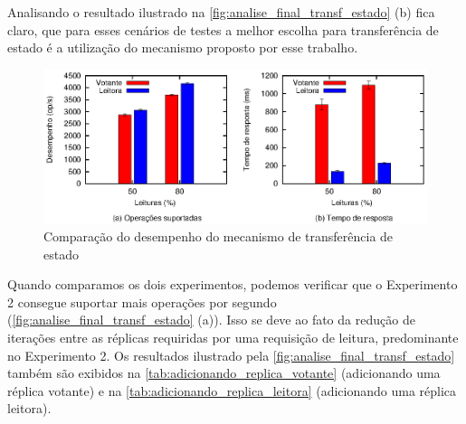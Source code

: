 Analisando o resultado ilustrado na \autoref{fig:analise_final_transf_estado} (b) fica
claro, que para esses cenários de testes a melhor escolha para transferência de estado é a
utilização do mecanismo proposto por esse trabalho.

\begin{figure}[ht]
  \centering
  \includegraphics[width=14cm]{conteudo/capitulos/figuras/final-transf-estado.eps}
  \caption{Comparação do desempenho do mecanismo de transferência de estado}
  \label{fig:analise_final_transf_estado}
\end{figure}

Quando comparamos os dois experimentos, podemos verificar que o Experimento 2 consegue
suportar mais operações por segundo (\autoref{fig:analise_final_transf_estado} (a)). Isso
se deve ao fato da redução de iterações entre as réplicas requiridas por uma requisição de
leitura, predominante no Experimento 2. Os resultados ilustrado pela
\autoref{fig:analise_final_transf_estado} também são exibidos na
\autoref{tab:adicionando_replica_votante} (adicionando uma réplica votante) e na
\autoref{tab:adicionando_replica_leitora} (adicionando uma réplica leitora).

\begin{table}[htb]
\end{table}

